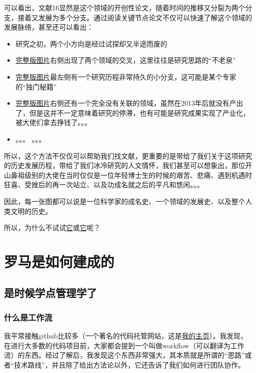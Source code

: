 \documentclass[UTF8]{ctexbook}
\begin{document}
可以看出，文献16显然是这个领域的开创性论文，随着时间的推移又分裂为两个分支，接着又发展为多个分支。通过阅读关键节点论文不仅可以快速了解这个领域的发展脉络，甚至还可以看出：

\begin{itemize}
	\item 研究之初，两个小方向是经过试探却又半途而废的
	\item \href{https://raw.githubusercontent.com/lonelybag/Latex_lonelybag/V1.0/Script/002_NOTE_of_MASTER/Figure/typical_trace_full.jpg}{完整版图片}右侧出现了两个领域的交叉，这里往往是研究思路的“不老泉”
	\item \href{https://raw.githubusercontent.com/lonelybag/Latex_lonelybag/V1.0/Script/002_NOTE_of_MASTER/Figure/typical_trace_full.jpg}{完整版图片}最左侧有一个研究历程非常持久的小分支，这可能是某个专家的“独门秘籍”
	\item \href{https://raw.githubusercontent.com/lonelybag/Latex_lonelybag/V1.0/Script/002_NOTE_of_MASTER/Figure/typical_trace_full.jpg}{完整版图片}右侧还有一个完全没有关联的领域，虽然在2013年后就没有产出了，但是这并不一定意味着研究的停滞，也有可能是研究成果实现了产业化，被大佬们拿去挣钱了。。。
	\item 。。。 。。。
\end{itemize}

所以，这个方法不仅仅可以帮助我们找文献，更重要的是带给了我们关于这项研究的历史发展历程，带给了我们冰冷研究的人文情怀，我们甚至可以想象出，那位开山鼻祖级别的大佬在当时仅仅是一位年轻博士生的时候的艰苦、悲痛、遇到机遇时狂喜、受挫后的再一次站立、以及功成名就之后的平凡和悠闲。。。

因此，每一张图都可以说是一位科学家的成名史、一个领域的发展史、以及整个人类文明的历史。

所以，为什么不试试\href{https://zhuanlan.zhihu.com/p/20902898}{它}或\href{https://zhuanlan.zhihu.com/p/30970993}{它}呢？

\chapter{罗马是如何建成的}
\section{是时候学点管理学了}
\subsection{什么是工作流}
我平常接触github比较多（一个著名的代码托管网站，这是\href{https://github.com/lonelybag?tab=repositories}{我的主页}）。我发现，在进行大多数的代码项目前，大家都会提到一个叫做workflow（可以翻译为工作流）的东西。经过了解后，我发现这个东西非常强大，其本质就是所谓的“思路”或者“技术路线”，并且除了给出方法论以外，它还告诉了我们如何进行团队协作。
\end{document}
